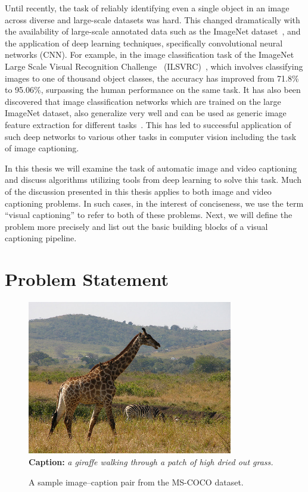 Until recently, the task of reliably identifying even a single object in an image
across diverse and large-scale datasets was hard.
This changed dramatically with the availability of large-scale annotated data
such as the ImageNet dataset~\cite{ImagenetOrig}, and the application of deep
learning techniques, specifically convolutional neural networks (CNN).
For example, in the image classification task of the ImageNet Large Scale Visual
Recognition Challenge~ (ILSVRC)~\cite{ILSVRC15}, which involves classifying
images to one of thousand object classes, the accuracy has improved from 71.8\%
to 95.06\%, surpassing the human performance on the same task. 
It has also been discovered that image classification networks which are
trained on the large ImageNet dataset, also generalize very well and can be
used as generic image feature extraction for different
tasks~\cite{yosinski2014transferable}.
This has led to successful application of such deep networks to various other
tasks in computer vision including the task of image captioning.

In this thesis we will examine the task of automatic image and video captioning and
discuss algorithms utilizing tools from deep learning to solve this task.
Much of the discussion presented in this thesis applies to both image and video
captioning problems.
In such cases, in the interest of conciseness, we use the term ``visual
captioning'' to refer to both of these problems.
Next, we will define the problem more precisely and list out the basic building
blocks of a visual captioning pipeline.

\section{Problem Statement}
\begin{figure}[th]
	\centering
	\includegraphics[width=0.8\textwidth]{./images/COCO_train2014_000000544856.jpg}\\
    \textbf{Caption:} \emph{a giraffe walking through a patch of high dried out grass.}
	\caption{A sample image--caption pair from the MS-COCO dataset.}
	\label{fig:ExampleCap}
\end{figure}

